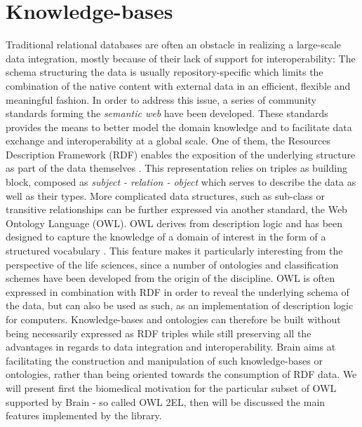 \documentclass{bioinfo}
\begin{document}
\section{Knowledge-bases}
Traditional relational databases are often an obstacle in realizing a large-scale data integration, 
mostly because of their lack of support for 
interoperability: The schema structuring the data is usually repository-specific which limits the combination of the 
native content with external data in an efficient, flexible and meaningful fashion. 
In order to address this issue, 
a series of community standards forming the \emph{semantic web} have been developed. These standards provides the means to better model
the domain knowledge and to facilitate data exchange and interoperability at a global scale.
One of them, the Resources Description 
Framework (RDF) enables the exposition of the underlying structure as part of the data themselves \citep{FrankManola}. This
representation relies on triples as building block, composed as \emph{subject - relation - object} which serves to
describe the data as well as their types. More complicated data structures, such as sub-class or
transitive relationships can be further expressed via another standard, the Web Ontology Language (OWL). OWL derives from description logic and
has been designed to capture the knowledge of a domain of interest in the form of a structured vocabulary \citep{W3COWLWorkingGroup}. 
This feature makes it particularly 
interesting from the perspective of the life sciences, since a number of ontologies and classification schemes
have been developed from the origin of 
the discipline. OWL is often expressed in combination with RDF in order to reveal the underlying schema of the data, but 
can also be used as such, as an implementation of description logic for computers. 
Knowledge-bases and ontologies can therefore be built without being necessarily expressed as RDF triples while still preserving all the 
advantages in regards to data integration and interoperability.
Brain aims at facilitating the construction and manipulation of 
such knowledge-bases or ontologies, rather than being oriented towards the consumption of RDF data. 
We will present first the biomedical motivation for the particular subset of OWL supported by Brain - so called OWL 2EL, 
then will be discussed the main features implemented by the library.
\end{document}
